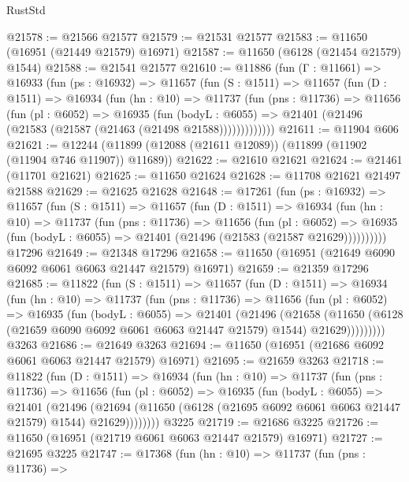 \begin{lexlean}{RustStd}
\begin{coremodule}
@21578 := @21566 @21577
@21579 := @21531 @21577
@21583 := @11650 (@16951 (@21449 @21579) @16971)
@21587 := @11650 (@6128 (@21454 @21579) @1544)
@21588 := @21541 @21577
@21610 := @11886
    (fun (Γ : @11661) =>
    @16933
      (fun (ps : @16932) =>
      @11657
        (fun (S : @1511) =>
        @11657
          (fun (D : @1511) =>
          @16934
            (fun (hn : @10) =>
            @11737
              (fun (pns : @11736) =>
              @11656
                (fun (pl : @6052) =>
                @16935
                  (fun (bodyL : @6055) =>
                  @21401 (@21496 (@21583 (@21587 (@21463 (@21498 @21588)))))))))))))
@21611 := @11904 @606
@21621 := @12244 (@11899 (@12088 (@21611 @12089)) (@11899 (@11902 (@11904 @746 @11907)) @11689))
@21622 := @21610 @21621
@21624 := @21461 (@11701 @21621)
@21625 := @11650 @21624
@21628 := @11708 @21621 @21497 @21588
@21629 := @21625 @21628
@21648 := @17261
    (fun (ps : @16932) =>
    @11657
      (fun (S : @1511) =>
      @11657
        (fun (D : @1511) =>
        @16934
          (fun (hn : @10) =>
          @11737
            (fun (pns : @11736) =>
            @11656
              (fun (pl : @6052) =>
              @16935 (fun (bodyL : @6055) => @21401 (@21496 (@21583 (@21587 @21629))))))))))
    @17296
@21649 := @21348 @17296
@21658 := @11650 (@16951 (@21649 @6090 @6092 @6061 @6063 @21447 @21579) @16971)
@21659 := @21359 @17296
@21685 := @11822
    (fun (S : @1511) =>
    @11657
      (fun (D : @1511) =>
      @16934
        (fun (hn : @10) =>
        @11737
          (fun (pns : @11736) =>
          @11656
            (fun (pl : @6052) =>
            @16935
              (fun (bodyL : @6055) =>
              @21401
                (@21496
                  (@21658
                    (@11650
                      (@6128 (@21659 @6090 @6092 @6061 @6063 @21447 @21579) @1544)
                      @21629)))))))))
    @3263
@21686 := @21649 @3263
@21694 := @11650 (@16951 (@21686 @6092 @6061 @6063 @21447 @21579) @16971)
@21695 := @21659 @3263
@21718 := @11822
    (fun (D : @1511) =>
    @16934
      (fun (hn : @10) =>
      @11737
        (fun (pns : @11736) =>
        @11656
          (fun (pl : @6052) =>
          @16935
            (fun (bodyL : @6055) =>
            @21401
              (@21496
                (@21694
                  (@11650 (@6128 (@21695 @6092 @6061 @6063 @21447 @21579) @1544) @21629))))))))
    @3225
@21719 := @21686 @3225
@21726 := @11650 (@16951 (@21719 @6061 @6063 @21447 @21579) @16971)
@21727 := @21695 @3225
@21747 := @17368
    (fun (hn : @10) =>
    @11737
      (fun (pns : @11736) =>

\end{coremodule}
\end{lexlean}
